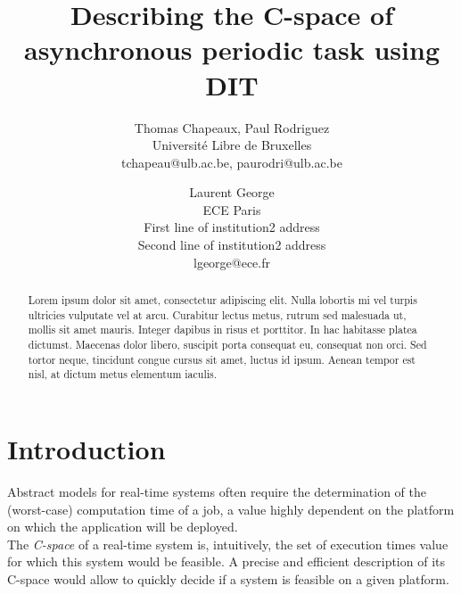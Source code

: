 \documentclass[times, 10pt,twocolumn, a4paper]{article}
\begin{document}
\title{Describing the C-space of asynchronous periodic task using DIT}

\author{Thomas Chapeaux, Paul Rodriguez\\
Universit\'e Libre de Bruxelles\\ tchapeau@ulb.ac.be, paurodri@ulb.ac.be \\
\and
Laurent George\\
ECE Paris\\
First line of institution2 address\\ Second line of institution2 address\\
lgeorge@ece.fr\\
}

\maketitle
\thispagestyle{empty}

\begin{abstract}
   Lorem ipsum dolor sit amet, consectetur adipiscing elit. Nulla lobortis mi vel turpis ultricies vulputate vel at arcu. Curabitur lectus metus, rutrum sed malesuada ut, mollis sit amet mauris. Integer dapibus in risus et porttitor. In hac habitasse platea dictumst. Maecenas dolor libero, suscipit porta consequat eu, consequat non orci. Sed tortor neque, tincidunt congue cursus sit amet, luctus id ipsum. Aenean tempor est nisl, at dictum metus elementum iaculis.
\end{abstract}


\section{Introduction}

Abstract models for real-time systems often require the determination of the (worst-case) computation time of a job, a value highly dependent on the platform on which the application will be deployed.\\

The \emph{C-space} of a real-time system is, intuitively, the set of execution times value for which this system would be feasible. A precise and efficient description of its C-space would allow to quickly decide if a system is feasible on a given platform.\\
\end{document}

